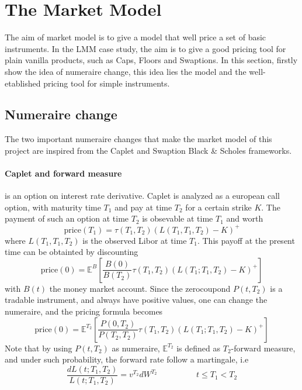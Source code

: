 \documentclass[a4paper,10pt]{article}
\begin{document}
\newpage
\section{The Market Model}
The aim of market model is to give a model that well price a set of basic instruments. In the LMM case study, the aim is to give a good pricing tool for plain vanilla products, such as Caps, Floors and Swaptions. In this section, firstly show the idea of numeraire change, this idea lies the model and the well-etablished pricing tool for simple instruments. 
\subsection{Numeraire change}
The two important numeraire changes that make the market model of this project are inspired from the Caplet and Swaption Black \& Scholes frameworks. 
\paragraph{ Caplet and forward measure } is an option on interest rate derivative. Caplet is analyzed as a european call option, with maturity time $T_1$ and pay at time $T_2$ for a certain strike $K$. The payment of such an option at time $T_2$ is obsevable at time $T_1$ and worth
\[
\text{price}(T_1) = \tau(T_1,T_2)( L(T_1,T_1,T_2) - K )^+ 
\] 
where $L(T_1,T_1,T_2)$ is the observed Libor at time $T_1$. This payoff at the present time can be obtainted by discounting 
\[
\text{price}(0) = \mathbb{E}^{B}\left[ \frac{B(0)}{B(T_2)} \tau(T_1,T_2)( L(T_1;T_1,T_2) - K )^+  \right]
\]
with $B(t)$ the money market account. Since the zerocoupond $P(t,T_2)$ is a tradable instrument, and always have positive values, one can change the numeraire, and the pricing formula becomes
\[
\text{price}(0) =\mathbb{E}^{T_2}\left[ \frac{P(0,T_2)}{P(T_2,T_2)} \tau(T_1,T_2)( L(T_1;T_1,T_2) - K )^+  \right]
\]
Note that by using $P(t,T_2)$ as numeraire, $\mathbb{E}^{T_2}$ is defined as $T_2$-forward measure, and under such probability, the forward rate follow a martingale, i.e
\[
\frac{dL(t;T_1,T_2)}{L(t;T_1,T_2)} = v^{T_2}dW^{T_2}
\hspace{2cm}
t\leq T_1 < T_2
\]
\end{document}
